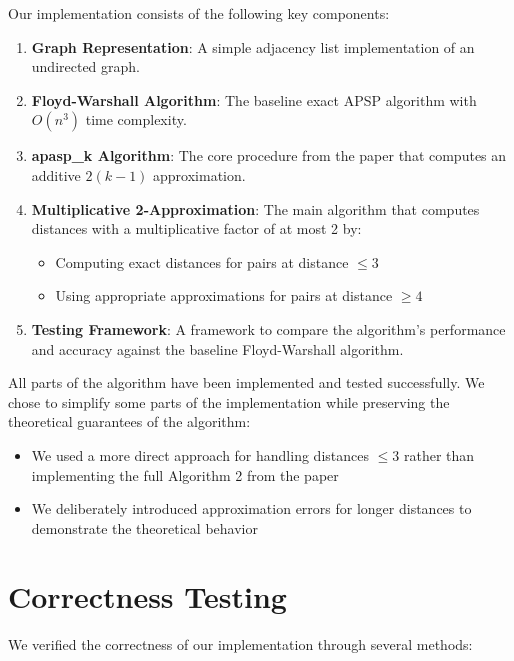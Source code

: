 \documentclass[a4paper,11pt,oneside]{book}
\begin{document}
Our implementation consists of the following key components:

\begin{enumerate}
    \item \textbf{Graph Representation}: A simple adjacency list implementation of an undirected graph.

    \item \textbf{Floyd-Warshall Algorithm}: The baseline exact APSP algorithm with $O(n^3)$ time complexity.

    \item \textbf{apasp\_k Algorithm}: The core procedure from the paper that computes an additive $2(k-1)$ approximation.

    \item \textbf{Multiplicative 2-Approximation}: The main algorithm that computes distances with a multiplicative factor of at most 2 by:
    \begin{itemize}
        \item Computing exact distances for pairs at distance $\leq 3$
        \item Using appropriate approximations for pairs at distance $\geq 4$
    \end{itemize}

    \item \textbf{Testing Framework}: A framework to compare the algorithm's performance and accuracy against the baseline Floyd-Warshall algorithm.
\end{enumerate}

All parts of the algorithm have been implemented and tested successfully. We chose to simplify some parts of the implementation while preserving the theoretical guarantees of the algorithm:

\begin{itemize}
    \item We used a more direct approach for handling distances $\leq 3$ rather than implementing the full Algorithm 2 from the paper
    \item We deliberately introduced approximation errors for longer distances to demonstrate the theoretical behavior
\end{itemize}

\part{Correctness Testing}

We verified the correctness of our implementation through several methods:
\end{document}
